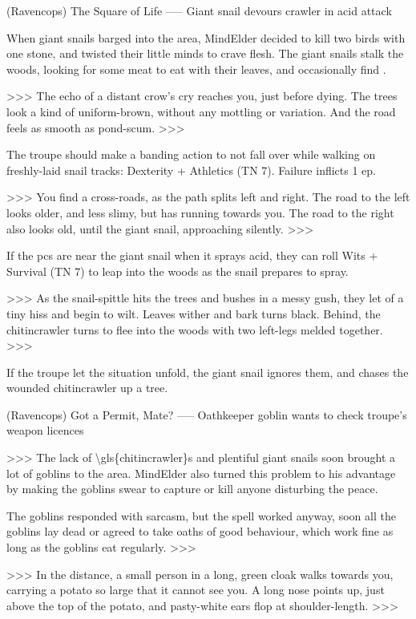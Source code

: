 (Ravencops) The Square of Life
-----
{Giant snail devours \gls{crawler} in acid attack}

When giant snails barged into the area, MindElder decided to kill two birds with one stone, and twisted their little minds to crave flesh.
The giant snails stalk the woods, looking for some meat to eat with their leaves, and occasionally find .

>>>
The echo of a distant crow's cry reaches you, just before dying.
The trees look a kind of uniform-brown, without any mottling or variation.
And the road feels as smooth as pond-scum.
>>>

The troupe should make a banding action to not fall over while walking on freshly-laid snail tracks: Dexterity + Athletics (TN 7).
Failure inflicts 1 \gls{ep}.

>>>
You find a cross-roads, as the path splits left and right.
The road to the left looks older, and less slimy, but has  running towards you.
The road to the right also looks old, until the giant snail, approaching silently.
>>>

If the \glspl{pc}  are near the giant snail when it sprays acid, they can roll Wits + Survival (TN 7) to leap into the woods as the snail prepares to spray.

>>>
As the snail-spittle hits the trees and bushes in a messy gush, they let of a tiny hiss and begin to wilt.
Leaves wither and bark turns black.
Behind, the \gls{chitincrawler} turns to flee into the woods with two left-legs melded together.
>>>

If the troupe let the situation unfold, the giant snail ignores them, and chases the wounded \gls{chitincrawler} up a tree.

(Ravencops) Got a Permit, Mate?
-----
{Oathkeeper goblin wants to check troupe's weapon licences}

>>>
The lack of \glspl{\gls{chitincrawler}} and plentiful giant snails soon brought a lot of goblins to the area.
MindElder also turned this problem to his advantage by making the goblins swear to capture or kill anyone disturbing the peace.

The goblins responded with sarcasm, but the spell worked anyway, soon all the goblins lay dead or agreed to take oaths of good behaviour, which work fine as long as the goblins eat regularly.
>>>

>>>
In the distance, a small person in a long, green cloak walks towards you, carrying a potato so large that it cannot see you.
A long nose points up, just above the top of the potato, and pasty-white ears flop at shoulder-length.
>>>

